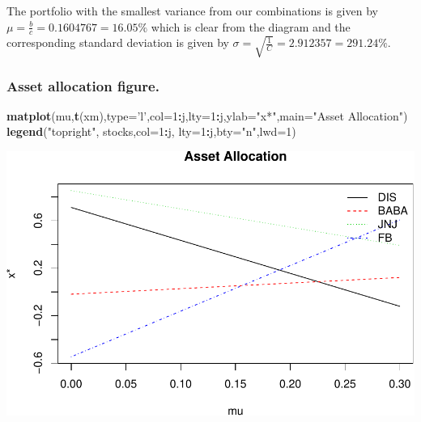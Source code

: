 \documentclass[]{article}
\newenvironment{Shaded}{\begin{snugshade}}{\end{snugshade}}
\newcommand{\KeywordTok}[1]{\textcolor[rgb]{0.13,0.29,0.53}{\textbf{#1}}}
\newcommand{\DataTypeTok}[1]{\textcolor[rgb]{0.13,0.29,0.53}{#1}}
\newcommand{\DecValTok}[1]{\textcolor[rgb]{0.00,0.00,0.81}{#1}}
\newcommand{\StringTok}[1]{\textcolor[rgb]{0.31,0.60,0.02}{#1}}
\newcommand{\OperatorTok}[1]{\textcolor[rgb]{0.81,0.36,0.00}{\textbf{#1}}}
\newcommand{\NormalTok}[1]{#1}
\begin{document}
The portfolio with the smallest variance from our combinations is given
by \(\mu = \frac{b}{c} = 0.1604767 = 16.05\%\) which is clear from the
diagram and the corresponding standard deviation is given by
\(\sigma= \sqrt{\frac{1}{C}} = 2.912357 = 291.24\%\).

\subsubsection{Asset allocation figure.}\label{asset-allocation-figure.}

\begin{Shaded}
\begin{Highlighting}[]
\KeywordTok{matplot}\NormalTok{(mu,}\KeywordTok{t}\NormalTok{(xm),}\DataTypeTok{type=}\StringTok{'l'}\NormalTok{,}\DataTypeTok{col=}\DecValTok{1}\OperatorTok{:}\NormalTok{j,}\DataTypeTok{lty=}\DecValTok{1}\OperatorTok{:}\NormalTok{j,}\DataTypeTok{ylab=}\StringTok{"x*"}\NormalTok{,}\DataTypeTok{main=}\StringTok{"Asset Allocation"}\NormalTok{)}
\KeywordTok{legend}\NormalTok{(}\StringTok{"topright"}\NormalTok{, stocks,}\DataTypeTok{col=}\DecValTok{1}\OperatorTok{:}\NormalTok{j, }\DataTypeTok{lty=}\DecValTok{1}\OperatorTok{:}\NormalTok{j,}\DataTypeTok{bty=}\StringTok{"n"}\NormalTok{,}\DataTypeTok{lwd=}\DecValTok{1}\NormalTok{)}
\end{Highlighting}
\end{Shaded}

\includegraphics{Markowitz_Research_Me_files/figure-latex/unnamed-chunk-17-1.pdf}
\end{document}
